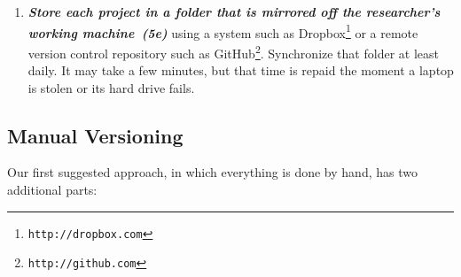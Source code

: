 \documentclass[10pt,letterpaper]{article}
\newcommand{\withurl}[2]{{#1}\footnote{{\texttt{#2}}}}
\newcommand{\practice}[2]{\textbf{\emph{{#2}~({#1})}}}
\begin{document}
\begin{enumerate}
\item

  \practice{5e}{Store each project in a folder that is mirrored off
  the researcher's working machine} using a system such as
  \withurl{Dropbox}{http://dropbox.com} or a remote version control
  repository such as \withurl{GitHub}{http://github.com}.  Synchronize
  that folder at least daily. It may take a few minutes, but that time
  is repaid the moment a laptop is stolen or its hard drive fails.

\end{enumerate}

\subsection*{Manual Versioning}

Our first suggested approach, in which everything is done by hand, has
two additional parts:
\end{document}
